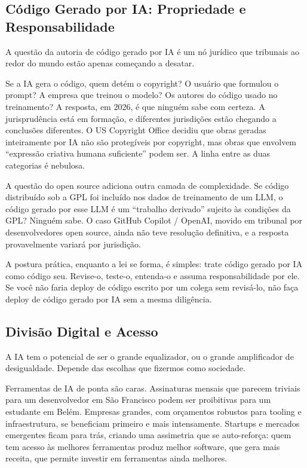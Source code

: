 \subsection{Código Gerado por IA: Propriedade e Responsabilidade}

A questão da autoria de código gerado por IA é um nó jurídico que tribunais ao redor do mundo estão apenas começando a desatar.

Se a IA gera o código, quem detém o copyright? O usuário que formulou o prompt? A empresa que treinou o modelo? Os autores do código usado no treinamento? A resposta, em 2026, é que ninguém sabe com certeza. A jurisprudência está em formação, e diferentes jurisdições estão chegando a conclusões diferentes. O US Copyright Office decidiu que obras geradas inteiramente por IA não são protegíveis por copyright, mas obras que envolvem ``expressão criativa humana suficiente'' podem ser. A linha entre as duas categorias é nebulosa.

A questão do open source adiciona outra camada de complexidade. Se código distribuído sob a GPL foi incluído nos dados de treinamento de um LLM, o código gerado por esse LLM é um ``trabalho derivado'' sujeito às condições da GPL? Ninguém sabe. O caso GitHub Copilot / OpenAI, movido em tribunal por desenvolvedores open source, ainda não teve resolução definitiva, e a resposta provavelmente variará por jurisdição.

A postura prática, enquanto a lei se forma, é simples: trate código gerado por IA como código seu. Revise-o, teste-o, entenda-o e assuma responsabilidade por ele. Se você não faria deploy de código escrito por um colega sem revisá-lo, não faça deploy de código gerado por IA sem a mesma diligência.

\subsection{Divisão Digital e Acesso}

A IA tem o potencial de ser o grande equalizador, ou o grande amplificador de desigualdade. Depende das escolhas que fizermos como sociedade.

Ferramentas de IA de ponta são caras. Assinaturas mensais que parecem triviais para um desenvolvedor em São Francisco podem ser proibitivas para um estudante em Belém. Empresas grandes, com orçamentos robustos para tooling e infraestrutura, se beneficiam primeiro e mais intensamente. Startups e mercados emergentes ficam para trás, criando uma assimetria que se auto-reforça: quem tem acesso às melhores ferramentas produz melhor software, que gera mais receita, que permite investir em ferramentas ainda melhores.

